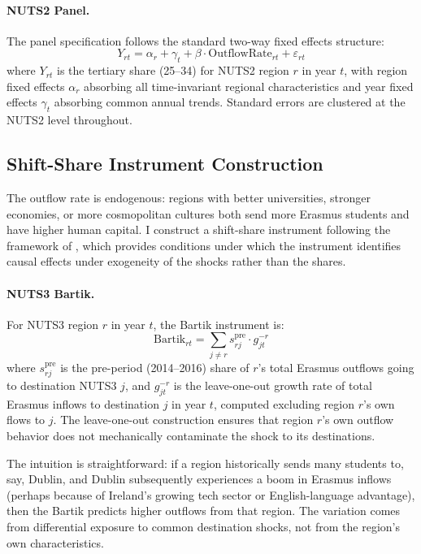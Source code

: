 \documentclass[12pt]{article}
\begin{document}
\paragraph{NUTS2 Panel.} The panel specification follows the standard two-way fixed effects structure:
\begin{equation}
Y_{rt} = \alpha_r + \gamma_t + \beta \cdot \text{OutflowRate}_{rt} + \varepsilon_{rt}
\label{eq:nuts2_panel}
\end{equation}
where $Y_{rt}$ is the tertiary share (25--34) for NUTS2 region $r$ in year $t$, with region fixed effects $\alpha_r$ absorbing all time-invariant regional characteristics and year fixed effects $\gamma_t$ absorbing common annual trends. Standard errors are clustered at the NUTS2 level throughout.

\subsection{Shift-Share Instrument Construction}

The outflow rate is endogenous: regions with better universities, stronger economies, or more cosmopolitan cultures both send more Erasmus students and have higher human capital. I construct a shift-share instrument following the framework of \citet{borusyak_hull_jaravel_2022}, which provides conditions under which the instrument identifies causal effects under exogeneity of the shocks rather than the shares.

\paragraph{NUTS3 Bartik.} For NUTS3 region $r$ in year $t$, the Bartik instrument is:
\begin{equation}
\text{Bartik}_{rt} = \sum_{j \neq r} s_{rj}^{\text{pre}} \cdot g_{jt}^{-r}
\label{eq:bartik}
\end{equation}
where $s_{rj}^{\text{pre}}$ is the pre-period (2014--2016) share of $r$'s total Erasmus outflows going to destination NUTS3 $j$, and $g_{jt}^{-r}$ is the leave-one-out growth rate of total Erasmus inflows to destination $j$ in year $t$, computed excluding region $r$'s own flows to $j$. The leave-one-out construction ensures that region $r$'s own outflow behavior does not mechanically contaminate the shock to its destinations.

The intuition is straightforward: if a region historically sends many students to, say, Dublin, and Dublin subsequently experiences a boom in Erasmus inflows (perhaps because of Ireland's growing tech sector or English-language advantage), then the Bartik predicts higher outflows from that region. The variation comes from differential exposure to common destination shocks, not from the region's own characteristics.
\end{document}
